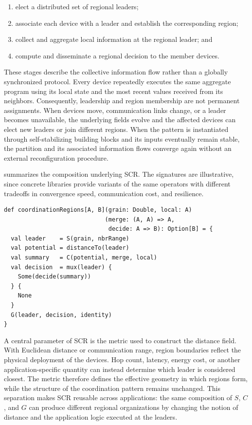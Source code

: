 \begin{enumerate}
  \item elect a distributed set of regional leaders;
  \item associate each device with a leader and establish the corresponding region;
  \item collect and aggregate local information at the regional leader; and
  \item compute and disseminate a regional decision to the member devices.
\end{enumerate}

These stages describe the collective information flow rather than a globally
 synchronized protocol.
%
Every device repeatedly executes the same aggregate program using its local
 state and the most recent values received from its neighbors.
%
Consequently, leadership and region membership are not permanent assignments.
%
When devices move, communication links change, or a leader becomes unavailable,
 the underlying fields evolve and the affected devices can elect new leaders or
 join different regions.
%
When the pattern is instantiated through self-stabilizing building blocks and
 its inputs eventually remain stable, the partition and its associated
 information flows converge again without an external reconfiguration procedure.

 summarizes the composition underlying \gls{SCR}.
%
The signatures are illustrative, since concrete libraries provide variants of
 the same operators with different tradeoffs in convergence speed,
 communication cost, and resilience.

\begin{lstlisting}[language=scafi,float=t,
  caption={Composition of aggregate operators into self-organizing coordination regions.},
  label={lst:scr-pattern}]
def coordinationRegions[A, B](grain: Double, local: A)
                             (merge: (A, A) => A,
                              decide: A => B): Option[B] = {
  val leader    = S(grain, nbrRange)
  val potential = distanceTo(leader)
  val summary   = C(potential, merge, local)
  val decision  = mux(leader) {
    Some(decide(summary))
  } {
    None
  }
  G(leader, decision, identity)
}
\end{lstlisting}

A central parameter of \gls{SCR} is the metric used to construct the distance
 field.
%
With Euclidean distance or communication range, region boundaries reflect the
 physical deployment of the devices.
%
Hop count, latency, energy cost, or another application-specific quantity can
 instead determine which leader is considered closest.
%
The metric therefore defines the effective geometry in which regions form,
 while the structure of the coordination pattern remains unchanged.
%
This separation makes \gls{SCR} reusable across applications: the same
 composition of $S$, $C$, and $G$ can produce different regional organizations
 by changing the notion of distance and the application logic executed at the
 leaders.

